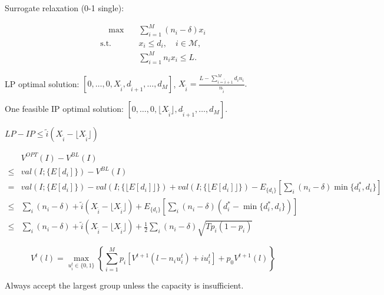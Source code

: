 
Surrogate relaxation (0-1 single):

\begin{align}\label{one_row}
    \quad \max \quad & \sum_{i = 1}^{M} (n_i - \delta) x_{i} \\
    \text {s.t.} \quad & x_{i} \leq d_{i}, \quad i \in \mathcal{M},  \\ 
    & \sum_{i=1}^{M} n_{i} x_{i} \leq L.
\end{align}

LP optimal solution: $[0, \ldots, 0, X_{\tilde{i}}, d_{\tilde{i}+1}, \ldots, d_{M}]$, $X_{\tilde{i}} = \frac{L - \sum_{i = \tilde{i}+1}^{M} {d_i n_i}}{n_{\tilde{i}}}.$

One feasible IP optimal solution: $[0, \ldots, 0, \lfloor X_{\tilde{i}} \rfloor, d_{\tilde{i}+1}, \ldots, d_{M}]$.

$LP - IP \leq \tilde{i} (X_{\tilde{i}} - \lfloor X_{\tilde{i}} \rfloor)$


\begin{align*}
    & V^{OPT}(I) - V^{BL}(I) \\
 \leq & val(I; \{E[d_{i}]\}) - V^{BL}(I) \\
 = & val(I; \{E[d_{i}]\}) - val(I; \{\lfloor E[d_{i}]\rfloor\}) + val(I; \{\lfloor E[d_{i}]\rfloor\}) - E_{\{d_{i}\}}[\sum_{i} (n_{i}-\delta) \min\{d_{i}^{*}, d_{i}\}] \\
 \leq & \sum_{i} (n_{i} - \delta) + \tilde{i} (X_{\tilde{i}} - \lfloor X_{\tilde{i}} \rfloor) + E_{\{d_{i}\}}[\sum_{i} (n_{i}-\delta) (d_{i}^{*} - \min\{d_{i}^{*}, d_{i}\})] \\
 \leq & \sum_{i} (n_{i} - \delta) + \tilde{i} (X_{\tilde{i}} - \lfloor X_{\tilde{i}} \rfloor) + \frac{1}{2} \sum_{i} (n_{i}-\delta) \sqrt{T p_{i} (1- p_{i})}
 \end{align*}
 

\begin{equation}
    V^{t}(l) =  \max_{u_{i}^{t} \in \{0,1\}} \left\{ \sum_{i=1}^{M} p_i \left[V^{t+1}(l-n_i u_{i}^{t})+ i u_{i}^{t}\right] + p_0 V^{t+1}(l)\right\}
\end{equation}

Always accept the largest group unless the capacity is insufficient.


